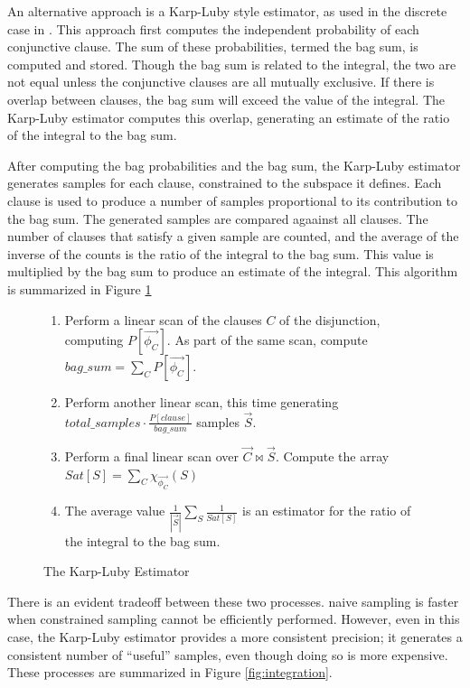 An  alternative approach  is a  Karp-Luby style  estimator, as
used  in the discrete case in \cite{RDS07, KO2008}.   This  approach first  computes  the
independent probability of each  conjunctive clause.  The sum of these
probabilities, termed the bag sum, is computed and stored.  Though the
bag sum is  related to the integral, the two are  not equal unless the
conjunctive clauses  are all mutually exclusive.  If  there is overlap
between clauses,  the bag sum will  exceed the value  of the integral.
The Karp-Luby estimator computes  this overlap, generating an estimate
of the ratio of the integral to the bag sum.

After computing the  bag probabilities and the bag  sum, the Karp-Luby
estimator  generates  samples  for  each clause,  constrained  to  the
subspace  it defines.   Each clause  is used  to produce  a  number of
samples  proportional  to  its  contribution  to  the  bag  sum.   The
generated samples  are compared agaainst  all clauses.  The  number of
clauses that  satisfy a given sample  are counted, and  the average of
the inverse of the counts is the ratio of the integral to the bag sum.
This value is multiplied by the  bag sum to produce an estimate of the
integral.  This algorithm is summarized in Figure
\ref{fig:klestimator}


\begin{figure}
\begin{center}
\begin{enumerate}
\item Perform a linear scan of the clauses $C$ of the disjunction, computing $P[\vec{\phi_C}]$.  As part of the same scan, compute $bag\_sum = \sum_C P[\vec{\phi_C}]$.  
\item Perform another linear scan, this time generating $total\_samples \cdot \frac{P[clause]}{bag\_sum}$ samples $\vec{S}$. 
\item Perform a final linear scan over $\vec{C} \bowtie \vec{S}$.  Compute the array $Sat[S] = \sum_C \chi_{\vec{\phi_C}}(S)$
\item The average value $\frac{1}{|\vec{S}|} \sum_{S}\frac{1}{Sat[S]}$ is an estimator for the ratio of the integral to the bag sum. 
\end{enumerate}
\caption{The Karp-Luby Estimator}
\label{fig:klestimator}
\end{center}
\end{figure}


There  is an  evident  tradeoff between  these  two processes.   naive
sampling is  faster when constrained  sampling cannot  be efficiently
performed.   However,  even  in  this case,  the  Karp-Luby  estimator
provides a more consistent precision; it generates a consistent number
of ``useful'' samples, even though  doing so is more expensive.  These
processes are summarized in Figure \ref{fig:integration}.


